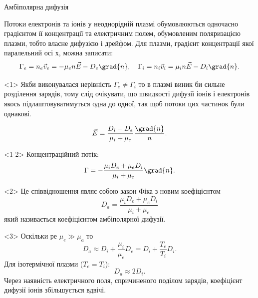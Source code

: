 \documentclass[]{beamer}
\begin{document}
\begin{frame}{Амбіполярна дифузія}{}
	\begin{block}{}\justifying
		\alert{Потоки електронів та іонів  у неоднорідній плазмі обумовлюються одночасно} градієнтом її концентрації та електричним полем, обумовленим
		поляризацією плазми, тобто власне \alert{дифузією} і \alert{дрейфом}. Для плазми, градієнт концентрації якої паралельний осі х, можна записати:
		\begin{equation*}
			\Gamma_e = n_e\vec{v}_e = -\mu_e n \vec{E} - D_e\grad{n}, \quad \Gamma_i = n_i\vec{v}_i = \mu_i n \vec{E} - D_i\grad{n}.
		\end{equation*}

		\begin{onlyenv}<1>
			{\scriptsize Якби виконувалася нерівність $\Gamma_e \neq \Gamma_i$ то в плазмі виник би сильне розділення зарядів, тому слід очікувати, що швидкості
				дифузії іонів і електронів якось підлаштовуватимуться одна до одної, так щоб потоки цих частинок були однакові. }

			\medskip

			\begin{equation*}
				\vec{E} = \frac{D_i - D_e}{\mu_i + \mu_e} \frac{\grad{n}}{n}.
			\end{equation*}
		\end{onlyenv}
		\begin{onlyenv}
			Концентраційний потік:
			\begin{equation*}
				\Gamma = - \frac{\mu_iD_e + \mu_eD_i}{\mu_i + \mu_e}\grad{n}.
			\end{equation*}
		\end{onlyenv}
		\begin{onlyenv}<2>
			Це співвідношення являє собою закон Фіка з новим коефіцієнтом
			\begin{equation*}
				D_a  = \frac{\mu_iD_e + \mu_eD_i}{\mu_i + \mu_e}
			\end{equation*}
			який називається \alert{коефіцієнтом амбіполярної дифузії}.
		\end{onlyenv}
		\begin{onlyenv}<3>
			Оскільки ре $\mu_e \gg \mu_a$ то
			\begin{equation*}
				D_a  \approx D_i + \frac{\mu_i}{\mu_e}D_e = D_i + \frac{T_e}{T_i}D_i .
			\end{equation*}
			Для ізотермічної плазми ($T_e = T_i$):
			\begin{equation*}
				D_a \approx 2D_i.
			\end{equation*}
			Через наявність електричного поля, спричиненого поділом зарядів, коефіцієнт дифузії іонів збільшується вдвічі.
		\end{onlyenv}
	\end{block}
\end{frame}
\end{document}
